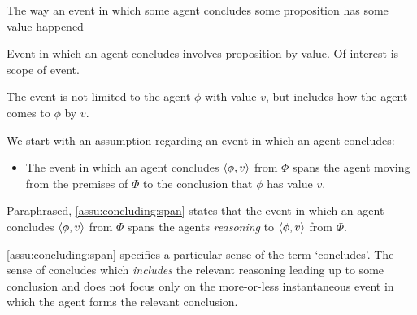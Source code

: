 \begin{note}
  The way an event in which some agent concludes some proposition has some value happened

  Event in which an agent concludes involves \evaling{} proposition by value.
  Of interest is scope of event.

  The event is not limited to the agent \evaling{} \(\phi\) with value \(v\), but includes how the agent comes to  \(\phi\) by \(v\).
\end{note}

\begin{note}
  We start with an assumption regarding an event in which an agent concludes:

  \begin{specification}
    \label{assu:concluding:span}

    \begin{itemize}
    \item
      The event in which an agent concludes \(\langle \phi, v \rangle\) from \(\Phi\) spans the agent moving from the premises of \(\Phi\) to the conclusion that \(\phi\) has value \(v\).
    \end{itemize}
    \vspace{-\baselineskip}
  \end{specification}

  Paraphrased, \autoref{assu:concluding:span} states that the event in which an agent concludes \(\langle \phi, v \rangle\) from \(\Phi\) spans the agents \emph{reasoning} to \(\langle \phi, v \rangle\) from \(\Phi\).
\end{note}

\begin{note}
  \autoref{assu:concluding:span} specifies a particular sense of the term `concludes'.
  The sense of concludes which \emph{includes} the relevant reasoning leading up to some conclusion and does not focus only on the more-or-less instantaneous event in which the agent forms the relevant conclusion.
\end{note}

